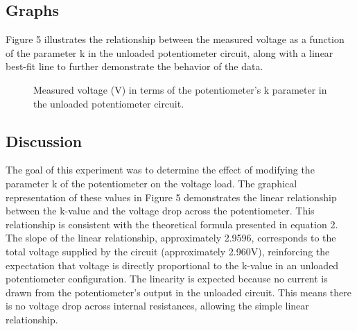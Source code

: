 \documentclass[a4paper]{article}
\newcommand{\unit}[1]{~\mathrm{#1}}
\begin{document}
\subsection{Graphs}
Figure 5 illustrates the relationship between the measured voltage as a function of the parameter 
k in the unloaded potentiometer circuit, along with a linear best-fit line to further demonstrate the behavior of the data.
\begin{figure}[!ht]
    \centering
    \caption{\centering Measured voltage (V) in terms of the potentiometer's k parameter in the unloaded potentiometer circuit.}
    \label{fig:3}
\end{figure}

\subsection{Discussion}
The goal of this experiment was to determine the effect of modifying
the parameter k of the potentiometer on the voltage load. 
The graphical representation of these values in Figure 5 demonstrates
the linear relationship between the k-value and the voltage drop across the potentiometer.
This relationship is consistent with the theoretical formula presented in equation 2.
The slope of the linear relationship, approximately 2.9596, corresponds
to the total voltage supplied by the circuit (approximately 2.960V),
reinforcing the expectation that voltage is directly proportional to the
k-value in an unloaded potentiometer configuration.
The linearity is expected because no current is drawn from the potentiometer's output in the unloaded circuit. 
This means there is no voltage drop across internal resistances, allowing the simple linear relationship.
\end{document}
